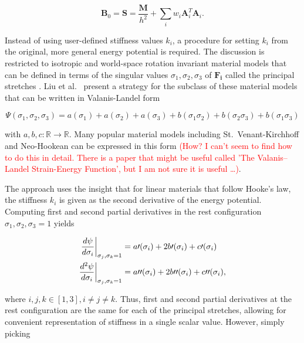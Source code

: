 \begin{equation}\label{eq:global-matrix-strain}
    \bm{B}_0 = \bm{S} = \frac{\bm{M}}{h^2} + \sum_i w_i \bm{A}_i^T \bm{A}_i.
\end{equation}

Instead of using user-defined stiffness values $k_i$, a procedure for setting $k_i$ from the original, more general energy
potential is required. The discussion is restricted to isotropic and world-space rotation invariant material models that 
can be defined in terms of the singular 
values $\sigma_1, \sigma_2, \sigma_3$ of $\bm{F_i}$ called the principal stretches \cite{sifakis2012}. Liu et al.\ 
\cite{liu2017} present a strategy for the subclass of these material models that can be written in Valanis-Landel form

\begin{equation}\label{eq:valanis-landel}
    \Psi(\sigma_1, \sigma_2, \sigma_3) = a(\sigma_1) + a(\sigma_2) + a(\sigma_3) + b(\sigma_1 \sigma_2) 
    + b(\sigma_2 \sigma_3) + b(\sigma_1 \sigma_3)
\end{equation}

\noindent with $a, b, c : \mathbb{R} \to \mathbb{R}$. Many popular material models including St.\ Venant-Kirchhoff and 
Neo-Hookean 
can be expressed in this form \textcolor{red}{(How? I can't seem to find how to do this in detail. There is a paper that 
might be useful called 'The Valanis–Landel Strain-Energy Function', but I am not sure it is useful \ldots)}.

The approach uses the insight that for linear materials that follow Hooke's law, the stiffness $k_i$ is given as the second 
derivative of the energy potential. Computing first and second partial derivatives in the rest configuration $\sigma_1, 
\sigma_2, \sigma_3 = 1$ yields

\begin{align}
    \evalat[\bigg]{\frac{d \psi}{d \sigma_i}}{\sigma_j, \sigma_k = 1} 
    &= a\prime(\sigma_i) + 2b\prime(\sigma_i) + c\prime(\sigma_i) \label{eq:valandis-landel-first} \\
    \evalat[\bigg]{\frac{d^2 \psi}{d \sigma_i}}{\sigma_j, \sigma_k = 1} 
    &= a\prime\prime(\sigma_i) + 2b\prime\prime(\sigma_i) + c\prime\prime(\sigma_i) \label{eq:valandis-landel-second},
\end{align}

\noindent where $i, j, k \in [1, 3], i \neq j \neq k$. Thus, first and second partial derivatives at the rest configuration are the same
for each of the principal stretches, allowing for convenient representation of stiffness in a single scalar value. However,
simply picking

